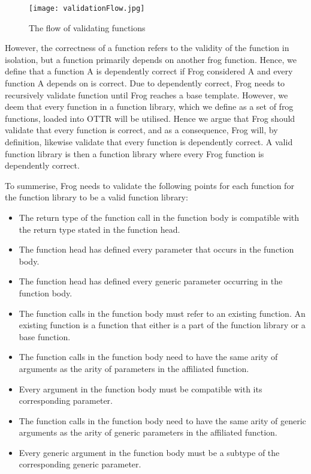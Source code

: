\begin{figure}
    \centering
    \texttt{[image: validationFlow.jpg]}
    \caption{The flow of validating functions}
    \label{fig:LC-explenations}
\end{figure}

\para 
However, the correctness of a function refers to the validity of the function in isolation, but a function primarily depends on another frog function. Hence, we define that a function A is dependently correct if Frog considered  A and every function A depends on is correct. Due to dependently correct, Frog needs to recursively validate function until Frog reaches a base template. However, we deem that every function in a function library, which we define as a set of frog functions, loaded into OTTR will be utilised. Hence we argue that Frog should validate that every function is correct, and as a consequence, Frog will, by definition, likewise validate that every function is dependently correct. A valid function library is then a function library where every Frog function is dependently correct. 

\para
To summerise, Frog needs to validate the following points for each function for the function library to be a valid function library: 
\begin{itemize}
    \item The return type of the function call in the function body is compatible with the return type stated in the function head. 
    \item The function head has defined every parameter that occurs in the function body.
    \item The function head has defined every generic parameter occurring in the function body.
    \item The function calls in the function body must refer to an existing function. An existing function is a function that either is a part of the function library or a base function. 
    \item The function calls in the function body need to have the same arity of arguments as the arity of parameters in the affiliated function.
    \item Every argument in the function body must be compatible with its corresponding parameter. 
    \item The function calls in the function body need to have the same arity of generic arguments as the arity of generic parameters in the affiliated function.
    \item Every generic argument in the function body must be a subtype of the corresponding generic parameter. 
\end{itemize}


